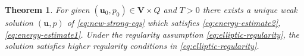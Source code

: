 \documentclass{amsart}
\newtheorem{theorem}{Theorem}[section]
\begin{document}
\begin{theorem}
	For given $(\boldsymbol{u}_0, p_0) \in \boldsymbol{V} \times Q$ and $T>0$ there exists a unique weak solution $(\boldsymbol{u}, p)$ of \eqref{eq:new-strong-eqs} which satisfies \eqref{eq:energy-estimate2}, \eqref{eq:energy-estimate1}. Under the regularity assumption \eqref{eq:elliptic-regularity}, the solution satisfies higher regularity conditions in \eqref{eq:elliptic-regularity}.
%
\end{theorem}
%
\end{document}
